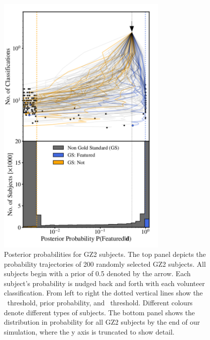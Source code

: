 \begin{figure}[t!] 
\centering
\includegraphics[width=3.25in]{Figures/human_machine/f12.pdf}
\caption[Galaxy posterior probabilities achieved through SWAP.]{Posterior probabilities for GZ2 subjects.  The top panel depicts the probability trajectories of 200 randomly selected GZ2 subjects. All subjects begin with a prior of 0.5 denoted by the arrow. Each subject's probability is nudged back and forth with each volunteer classification. From left to right the dotted vertical lines show the \notfeat~threshold, prior probability, and \feat~threshold. Different colours denote different types of subjects. The bottom panel shows the distribution in probability for all GZ2 subjects by the end of our simulation, where the y axis is truncated to show detail.  \label{fig: subject probabilities}}
\end{figure}


